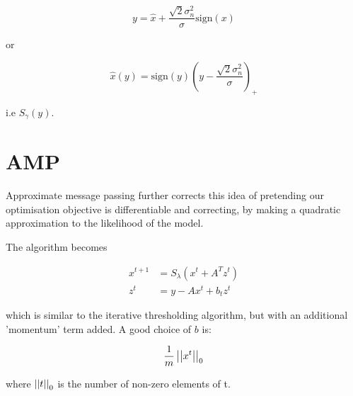 \documentclass{article}
\begin{document}
$$
y =  \hat{x} + \frac{\sqrt{2}\sigma^2_n}{\sigma}\mathrm{sign}\left(x\right)
$$

or

$$
\hat{x}\left(y\right) = \mathrm{sign}(y)\left(y - \frac{\sqrt{2}\sigma^2_n}{\sigma}\right)_+
$$

i.e \(S_\gamma(y)\).

\section{AMP}
Approximate message passing further corrects this idea of pretending our optimisation objective is differentiable and correcting, by making a quadratic approximation to the likelihood of the model.

The algorithm becomes

\begin{align*}
x^{t+1} &= S_\lambda\left(x^t + A^Tz^t\right) \\
z^t &= y - Ax^t + b_tz^t
\end{align*}

which is similar to the iterative thresholding algorithm, but with an additional 'momentum' term added. A good choice of \(b\) is:

\begin{equation}
\frac{1}{m}\left|\left|x^t\right|\right|_0
\end{equation}

where \(\left|\left|t\right|\right|_0\) is the number of non-zero elements of t.
\end{document}
